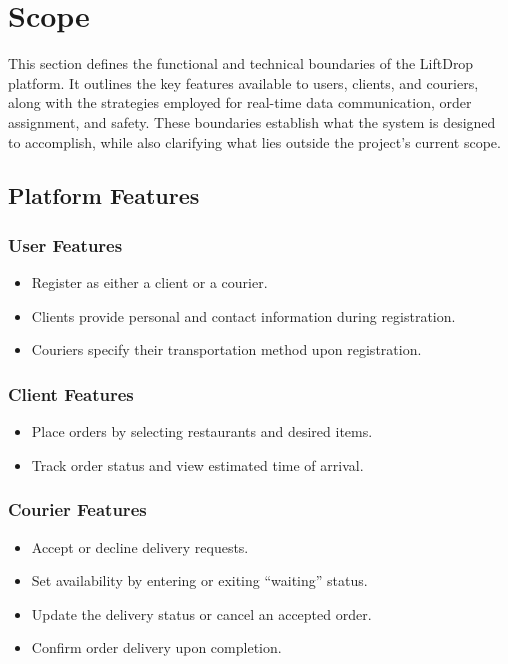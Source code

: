 \section{Scope}

This section defines the functional and technical boundaries of the LiftDrop platform. It outlines the key features available to users, clients, and couriers, along with the strategies employed for real-time data communication, order assignment, and safety. These boundaries establish what the system is designed to accomplish, while also clarifying what lies outside the project's current scope.

\subsection{Platform Features}

\subsubsection{User Features}
\begin{itemize}
    \item Register as either a client or a courier.
    \item Clients provide personal and contact information during registration.
    \item Couriers specify their transportation method upon registration.
\end{itemize}

\subsubsection{Client Features}
\begin{itemize}
    \item Place orders by selecting restaurants and desired items.
    \item Track order status and view estimated time of arrival.
\end{itemize}

\subsubsection{Courier Features}
\begin{itemize}
    \item Accept or decline delivery requests.
    \item Set availability by entering or exiting “waiting” status.
    \item Update the delivery status or cancel an accepted order.
    \item Confirm order delivery upon completion.
\end{itemize}

